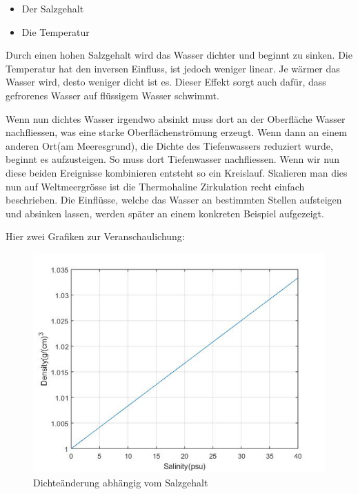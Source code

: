 \begin{itemize}
	\item Der Salzgehalt
	\item Die Temperatur
\end{itemize}

Durch einen hohen Salzgehalt wird das Wasser dichter und beginnt zu sinken. Die Temperatur hat den inversen Einfluss, ist jedoch weniger linear. Je wärmer das Wasser wird, desto weniger dicht ist es. Dieser Effekt sorgt auch dafür, dass gefrorenes Wasser auf flüssigem Wasser schwimmt.

Wenn nun dichtes Wasser irgendwo absinkt muss dort an der Oberfläche Wasser nachfliessen, was eine starke Oberflächenströmung erzeugt. Wenn dann an einem anderen Ort(am Meeresgrund), die Dichte des Tiefenwassers reduziert wurde, beginnt es aufzusteigen. So muss dort Tiefenwasser nachfliessen. Wenn wir nun diese beiden Ereignisse kombinieren entsteht so ein Kreislauf. Skalieren man dies nun auf Weltmeergrösse ist die Thermohaline Zirkulation recht einfach beschrieben. Die Einflüsse, welche das Wasser an bestimmten Stellen aufsteigen und absinken lassen, werden später an einem konkreten Beispiel aufgezeigt.

Hier zwei Grafiken zur Veranschaulichung:

\begin{figure}[H]
	\centering
\includegraphics[width=12cm]{thermohalin/Code/graphs/graph_salinity.jpg}
\caption{Dichteänderung abhängig vom Salzgehalt}
\end{figure}

